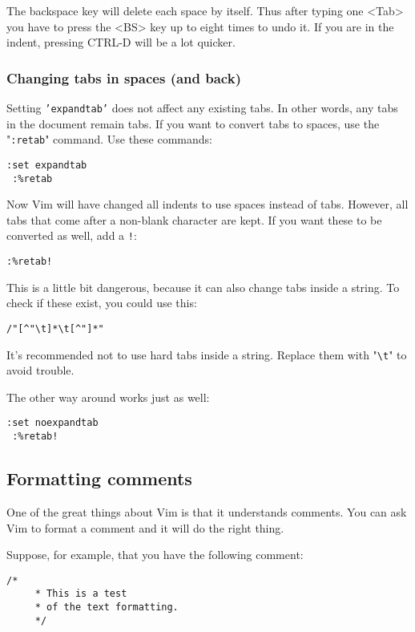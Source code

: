 The backspace key will delete each space by itself.
Thus after typing one <Tab> you have to press the <BS> key up to eight times to undo it.
If you are in the indent, pressing CTRL-D will be a lot quicker.

\subsubsection{Changing tabs in spaces (and back)}
Setting \texttt{'expandtab'} does not affect any existing tabs.
In other words, any tabs in the document remain tabs.
If you want to convert tabs to spaces, use the "\texttt{:retab}" command.
Use these commands:

\begin{Verbatim}[samepage=true]
 :set expandtab
 :%retab
\end{Verbatim}

Now Vim will have changed all indents to use spaces instead of tabs.
However, all tabs that come after a non-blank character are kept.
If you want these to be converted as well, add a \texttt{!}:

\begin{Verbatim}[samepage=true]
 :%retab!
\end{Verbatim}

This is a little bit dangerous, because it can also change tabs inside a string.
To check if these exist, you could use this:

\begin{Verbatim}[samepage=true]
 /"[^"\t]*\t[^"]*"
\end{Verbatim}

It's recommended not to use hard tabs inside a string.
Replace them with "\texttt{\textbackslash{}t}" to avoid trouble.

The other way around works just as well:

\begin{Verbatim}[samepage=true]
 :set noexpandtab
 :%retab!
\end{Verbatim}
\subsection{Formatting comments}
One of the great things about Vim is that it understands comments.
You can ask Vim to format a comment and it will do the right thing.

Suppose, for example, that you have the following comment:

\begin{Verbatim}[samepage=true]
    /* 
     * This is a test 
     * of the text formatting. 
     */ 
\end{Verbatim}

